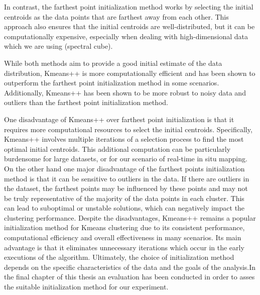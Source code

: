 \documentclass{article}
\begin{document}
{                In contrast, the farthest point initialization method works by selecting the initial centroids as the data points that are farthest away from each other. This approach also ensures that the initial centroids are well-distributed, but it can be computationally expensive, especially when dealing with high-dimensional data which we are using (spectral cube).\par
                While both methods aim to provide a good initial estimate of the data distribution, Kmeans++ is more computationally efficient and has been shown to outperform the farthest point initialization method in some scenarios. Additionally, Kmeans++ has been shown to be more robust to noisy data and outliers than the farthest point initialization method.\par
                One disadvantage of Kmeans++ over farthest point initialization is that it requires more computational resources to select the initial centroids. Specifically, Kmeans++ involves multiple iterations of a selection process to find the most optimal initial centroids. This additional computation can be particularly burdensome for large datasets, or for our scenario of real-time in situ mapping.
                On the other hand one major disadvantage of the farthest points initialization method is that it can be sensitive to outliers in the data. If there are outliers in the dataset, the farthest points may be influenced by these points and may not be truly representative of the majority of the data points in each cluster. This can lead to suboptimal or unstable solutions, which can negatively impact the clustering performance.
                Despite the disadvantages, Kmeans++ remains a popular initialization method for Kmeans clustering due to its consistent performance, computational efficiency and overall effectiveness in many scenarios. Its main advantage is that it eliminates unnecessary iterations which occur in the early executions of the algorithm. Ultimately, the choice of initialization method depends on the specific characteristics of the data and the goals of the analysis.In the final chapter of this thesis an evaluation has been conducted in order to asses the suitable initialization method for our experiment.\par
                
}
\end{document}
